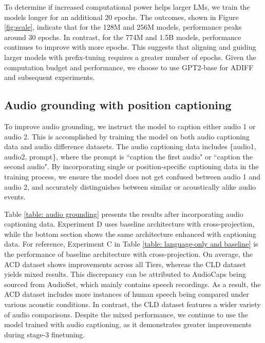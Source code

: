 To determine if increased computational power helps larger LMs, we train the models longer for an additional 20 epochs. The outcomes, shown in Figure \ref{fig:scale}, indicate that for the 128M and 256M models, performance peaks around 30 epochs. In contrast, for the 774M and 1.5B models, performance continues to improve with more epochs. This suggests that aligning and guiding larger models with prefix-tuning requires a greater number of epochs. Given the computation budget and performance, we choose to use GPT2-base for ADIFF and subsequent experiments.

 \vspace{-0.1in}
\subsection{Audio grounding with position captioning} \label{subsec: improving modality alignment with training} \vspace{-0.1in}
To improve audio grounding, we instruct the model to caption either audio 1 or audio 2. This is accomplished by training the model on both audio captioning data and audio difference datasets. The audio captioning data includes \{audio1, audio2, prompt\}, where the prompt is ``caption the first audio" or ``caption the second audio". By incorporating single or position-specific captioning data in the training process, we ensure the model does not get confused between audio 1 and audio 2, and accurately distinguishes between similar or acoustically alike audio events.

Table \ref{table: audio grounding} presents the results after incorporating audio captioning data. Experiment D uses baseline architecture with cross-projection, while the bottom section shows the same architecture enhanced with captioning data. For reference, Experiment C in Table \ref{table: language-only and baseline} is the performance of baseline architecture with cross-projection. On average, the ACD dataset shows improvements across all Tiers, whereas the CLD dataset yields mixed results. This discrepancy can be attributed to AudioCaps being sourced from AudioSet, which mainly contains speech recordings. As a result, the ACD dataset includes more instances of human speech being compared under various acoustic conditions. In contrast, the CLD dataset features a wider variety of audio comparisons. Despite the mixed performance, we continue to use the model trained with audio captioning, as it demonstrates greater improvements during stage-3 finetuning. \vspace{-0.1in}

